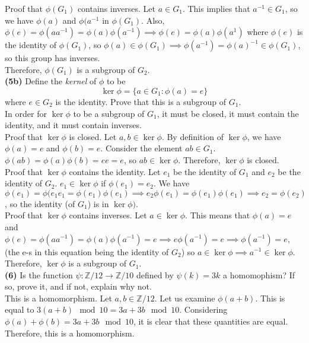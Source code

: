 \documentclass[12pt,letterpaper]{article}
\begin{document}
Proof that \(\phi(G_{1})\) contains inverses. Let \(a \in G_{1}\). This implies that \(a^{-1} \in G_{1}\), so we have \(\phi(a)\) and \(\phi(a^{-1}\) in \(\phi(G_{1})\). Also, \(\phi(e) = \phi(aa^{-1}) = \phi(a)\phi(a^{-1}) \implies \phi(e) = \phi(a)\phi(a^{1})\) where \(\phi(e)\) is the identity of \(\phi(G_{1})\), so \(\phi(a) \in \phi(G_{1})\implies \phi(a^{-1}) = \phi(a)^{-1} \in \phi(G_{1})\), so this group has inverses. \\

Therefore, \(\phi(G_{1})\) is a subgroup of \(G_{2}\). \\

\textbf{(5b)} Define the \textit{kernel} of \(\phi\) to be \[\ker \phi = \{a \in G_{1} : \phi(a) = e\}\] where \(e\in G_{2}\) is the identity. Prove that this is a subgroup of \(G_{1}\). \\

In order for \(\ker \phi\) to be  a subgroup of \(G_{1}\), it must be closed, it must contain the identity, and it must contain inverses. \\

Proof that \(\ker \phi\) is closed. Let \(a,b \in \ker\phi\). By definition of \(\ker\phi\), we have \(\phi(a) = e\) and \(\phi(b) = e\). Consider the element \(ab \in G_{1}\). \(\phi(ab) = \phi(a)\phi(b) = ee = e\), so \(ab \in \ker\phi\). Therefore, \(\ker\phi\) is closed. \\

Proof that \(\ker \phi \) contains the identity. Let \(e_{1}\) be the identity of \(G_{1}\) and \(e_{2}\) be the identity of \(G_{2}\). \(e_{1} \in \ker\phi\) if \(\phi(e_{1}) = e_{2}\). We have \(\phi(e_{1}) = \phi(e_{1}e_{1} =  \phi(e_{1})\phi(e_{1}) \implies e_{2}\phi(e_{1}) = \phi(e_{1})\phi(e_{1}) \implies e_{2} = \phi(e_{2})\), so the identity (of \(G_{1}\)) is in \(\ker\phi)\). \\

Proof that \(\ker\phi\) contains inverses. Let \(a \in \ker\phi\). This means that \(\phi(a) = e\) and \(\phi(e) = \phi(aa^{-1}) = \phi(a)\phi(a^{-1}) = e \implies e\phi(a^{-1}) = e \implies \phi(a^{-1}) = e\), (the e-s in this equation being the identity of \(G_{2}\)) so \(a \in \ker\phi \implies a^{-1} \in \ker\phi\). \\

Therefore, \(\ker\phi\) is a subgroup of \(G_{1}\). \\

\textbf{(6)} Is the function \(\psi: \mathbb{Z}/12 \to \mathbb{Z}/10\) defined by \(\psi(k) = 3k\) a homomophism? If so, prove it, and if not, explain why not. \\

This is a homomorphism. Let \(a,b \in \mathbb{Z}/12\). Let us examine \(\phi(a+b)\). This is equal to \(3(a+b) \mod 10 = 3a+3b \mod 10\). Considering \(\phi(a) + \phi(b) = 3a + 3b \mod 10\), it is clear that these quantities are equal. Therefore, this is a homomorphism.
\end{document}
